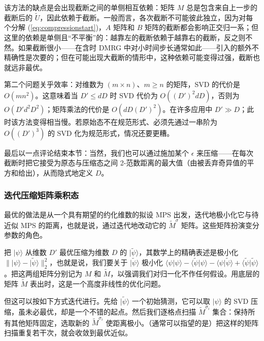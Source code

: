 \documentclass[a4paper,10pt,oneside,onecolumn,1p,times]{elsarticle}
\newcommand{\ket}[1]{\mbox{$| #1  \rangle$}}
\newcommand{\braket}[2]{\mbox{$\langle #1  | #2 \rangle$}} 	%
\begin{document}
该方法的缺点是会出现截断之间的单侧相互依赖：矩阵 $M$ 总是包含来自上一步的截断后的 $\tilde{U}$，因此依赖于截断。一般而言，各次截断不可能彼此独立，因为对每个分解 (\ref{eq:compressionstart})，$A$ 矩阵和 $B$ 矩阵的截断都会影响正交归一系；但这里的依赖是单侧且``不平衡''的：越靠左的截断依赖于越靠右的截断，反之则不然。如果截断很小——在含时 DMRG 中对小时间步长通常如此——引入的额外不精确性是次要的；但在可能出现大截断的情形中，这种依赖可能变得过强，截断也就远非最优。

第二个问题关乎效率：对维数为 $(m\times n)$、$m\ge n$ 的矩阵，SVD 的代价是 $O(m n^2)$。这意味着当 $D' \le dD$ 时 SVD 代价为 $O((D')^2 dD)$，否则为 $O(D' d^2 D^2)$；矩阵乘法的代价是 $O(dD(D')^2)$。在许多应用中 $D'\gg D$；此时该方法变得相当慢。若原始态不在规范形式、必须先通过一串阶为 $O((D')^3)$ 的 SVD 化为规范形式，情况还要更糟。

最后以一点评论结束本节：当然，我们也可以通过施加某个 $\epsilon$ 来压缩——在每次截断时把它接受为原态与压缩态之间 2-范数距离的最大值（由被丢弃奇异值的平方和给出），从而隐式地定义 $D$。

\subsubsection{迭代压缩矩阵乘积态}
最优的做法是从一个具有期望的约化维数的拟设 MPS 出发，迭代地极小化它与待近似 MPS 的距离，也就是说，通过迭代地改动它的 $\tilde{M}^\sigma$ 矩阵。这些矩阵扮演变分参数的角色。

把 $\ket{\psi}$ 从维数 $D'$ 最优压缩为维数 $D$ 的 $\ket{\tilde{\psi}}$，其数学上的精确表述是极小化 $\| \ket{\psi} - \ket{\tilde{\psi}} \|_2^2$，也就是说，我们要关于 $\ket{\tilde{\psi}}$ 极小化 $\braket{\psi}{\psi} - \braket{\tilde{\psi}}{\psi} -\braket{\psi}{\tilde{\psi}} + \braket{\tilde{\psi}}{\tilde{\psi}}$。把这两组矩阵分别记为 $M$ 和 $\tilde{M}$，以强调我们对归一化不作任何假设。用底层的矩阵 $\tilde{M}$ 表出时，这是一个高度非线性的优化问题。

但这可以按如下方式迭代进行。先给 $\ket{\tilde{\psi}}$ 一个初始猜测，它可以取 $\ket{\psi}$ 的 SVD 压缩，虽未必最优，却是一个不错的起点。然后我们逐格点扫描 $\tilde{M}^{\sigma_i}$ 集合：保持所有其他矩阵固定，选取新的 $\tilde{M}^{\sigma_i}$ 使距离极小。（通常可以指望的是）把这样的矩阵扫描重复若干次，就会收敛到最优近似。
\end{document}
